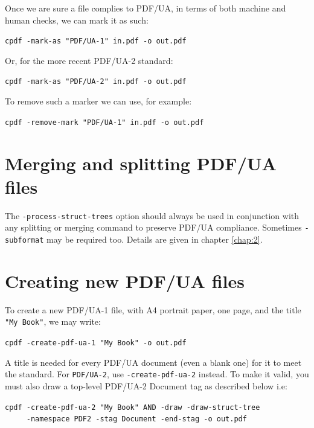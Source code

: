 \documentclass{book}
\begin{document}
Once we are sure a file complies to PDF/UA, in terms of both machine and human checks, we can mark it as such:

  \begin{framed}
    \noindent\small\verb!cpdf -mark-as "PDF/UA-1" in.pdf -o out.pdf!
  \end{framed}

\noindent Or, for the more recent PDF/UA-2 standard:

  \begin{framed}
    \noindent\small\verb!cpdf -mark-as "PDF/UA-2" in.pdf -o out.pdf!
  \end{framed}

\noindent To remove such a marker we can use, for example:

  \begin{framed}
    \noindent\small\verb!cpdf -remove-mark "PDF/UA-1" in.pdf -o out.pdf!
  \end{framed}

\section{Merging and splitting PDF/UA files}

\noindent The \texttt{-process-struct-trees} option should always be used in conjunction with any splitting or merging command to preserve PDF/UA compliance. Sometimes \texttt{-subformat} may be required too. Details are given in chapter \ref{chap:2}.

\section{Creating new PDF/UA files}

To create a new PDF/UA-1 file, with A4 portrait paper, one page, and the title \texttt{"My Book"}, we may write:

  \begin{framed}
    \noindent\small\verb!cpdf -create-pdf-ua-1 "My Book" -o out.pdf!
  \end{framed}

\noindent A title is needed for every PDF/UA document (even a blank one) for it to meet the standard. For \texttt{PDF/UA-2}, use \texttt{-create-pdf-ua-2} instead. To make it valid, you must also draw a top-level PDF/UA-2 Document tag as described below i.e:

\begin{framed}
  \noindent\small\verb!cpdf -create-pdf-ua-2 "My Book" AND -draw -draw-struct-tree!\\
  \noindent\small\verb!     -namespace PDF2 -stag Document -end-stag -o out.pdf!
\end{framed}
\end{document}
